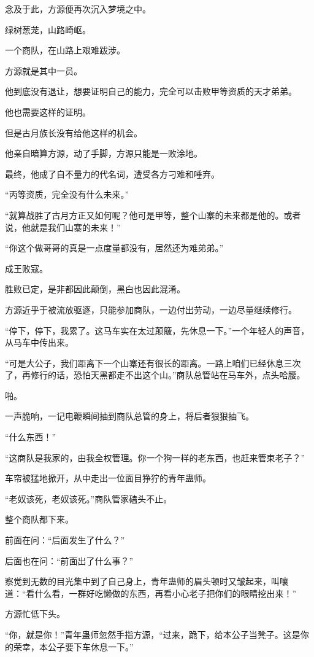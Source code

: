 \begin{this_body}
念及于此，方源便再次沉入梦境之中。

绿树葱茏，山路崎岖。

一个商队，在山路上艰难跋涉。

方源就是其中一员。

他到底没有退让，想要证明自己的能力，完全可以击败甲等资质的天才弟弟。

他也需要这样的证明。

但是古月族长没有给他这样的机会。

他亲自暗算方源，动了手脚，方源只能是一败涂地。

最终，他成了自不量力的代名词，遭受各方刁难和唾弃。

“丙等资质，完全没有什么未来。”

“就算战胜了古月方正又如何呢？他可是甲等，整个山寨的未来都是他的。或者说，他就是我们山寨的未来！”

“你这个做哥哥的真是一点度量都没有，居然还为难弟弟。”

成王败寇。

胜败已定，是非都因此颠倒，黑白也因此混淆。

方源近乎于被流放驱逐，只能参加商队，一边付出劳动，一边尽量继续修行。

“停下，停下，我累了。这马车实在太过颠簸，先休息一下。”一个年轻人的声音，从马车中传出来。

“可是大公子，我们距离下一个山寨还有很长的距离。一路上咱们已经休息三次了，再修行的话，恐怕天黑都走不出这个山。”商队总管站在马车外，点头哈腰。

啪。

一声脆响，一记电鞭瞬间抽到商队总管的身上，将后者狠狠抽飞。

“什么东西！”

“这商队是我家的，由我全权管理。你一个狗一样的老东西，也赶来管束老子？”

车帘被猛地掀开，从中走出一位面目狰狞的青年蛊师。

“老奴该死，老奴该死。”商队管家磕头不止。

整个商队都下来。

前面在问：“后面发生了什么？”

后面也在问：“前面出了什么事？”

察觉到无数的目光集中到了自己身上，青年蛊师的眉头顿时又皱起来，叫嚷道：“看什么看，一群好吃懒做的东西，再看小心老子把你们的眼睛挖出来！”

方源忙低下头。

“你，就是你！”青年蛊师忽然手指方源，“过来，跪下，给本公子当凳子。这是你的荣幸，本公子要下车休息一下。”


\end{this_body}
